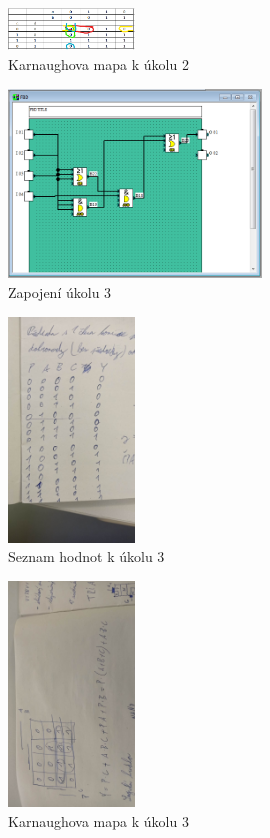 \documentclass[a4paper]{article}
\begin{document}
\begin{figure}[H]
	\centering
	\includegraphics[width=0.3\textwidth]{hodnoty3.png}
	\caption{Karnaughova mapa k úkolu 2}
	\label{fig:hodnoty2}
\end{figure}


\begin{figure}[H]
	\centering
	\includegraphics[width=0.6\textwidth]{PLC_3.png}
	\caption{Zapojení úkolu 3}
	\label{fig:mesh3}
\end{figure}

\begin{figure}[H]
	\centering
	\includegraphics[width=0.3\textwidth]{foto1.jpg}
	\caption{Seznam hodnot k úkolu 3}
	\label{fig:foto1}
\end{figure}

\begin{figure}[H]
	\centering
	\includegraphics[width=0.3\textwidth, angle=270]{foto2.jpg}
	\caption{Karnaughova mapa k úkolu 3}
	\label{fig:foto2}
\end{figure}
\end{document}
